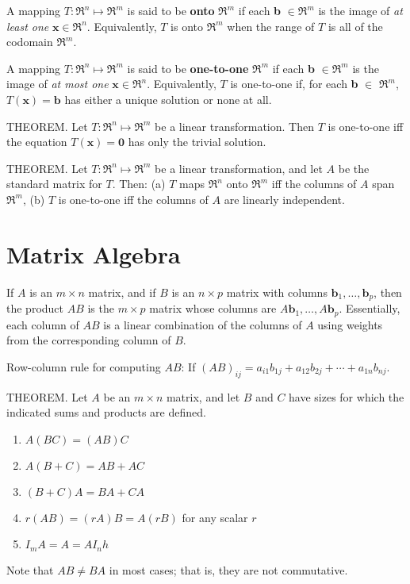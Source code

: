 \documentclass{article}
\begin{document}
\hfill \newline A mapping $T: \Re^n \mapsto \Re^m$ is said to be \textbf{onto} $\Re^m$ if each \textbf{b} $\in \Re^m$ is the image of \textit{at least one} $\textbf{x} \in \Re^n$. Equivalently, $T$ is onto $\Re^m$ when the range of $T$ is all of the codomain $\Re^m$.

\hfill \newline A mapping $T: \Re^n \mapsto \Re^m$ is said to be \textbf{one-to-one} $\Re^m$ if each \textbf{b} $\in \Re^m$ is the image of \textit{at most one} $\textbf{x} \in \Re^n$. Equivalently, $T$ is one-to-one if, for each \textbf{b} $\in$ $\Re^m$, $T(\textbf{x})=\textbf{b}$ has either a unique solution or none at all. 

\hfill \newline THEOREM. Let $T: \Re^n \mapsto \Re^m$ be a linear transformation. Then $T$ is one-to-one iff the equation $T(\textbf{x})=\textbf{0}$ has only the trivial solution.

\hfill \newline THEOREM. Let $T: \Re^n \mapsto \Re^m$ be a linear transformation, and let $A$ be the standard matrix for $T$. Then: (a) $T$ maps $\Re^n$ onto $\Re^m$ iff the columns of $A$ span $\Re^m$, (b) $T$ is one-to-one iff the columns of $A$ are linearly independent. 








\section{Matrix Algebra}

If $A$ is an $m \times n$ matrix, and if $B$ is an $n \times p$ matrix with columns $\textbf{b}_1,\dots,\textbf{b}_p$, then the product $AB$ is the $m \times p$ matrix whose columns are $A\textbf{b}_1,\dots,A\textbf{b}_p$. Essentially, each column of $AB$ is a linear combination of the columns of $A$ using weights from the corresponding column of $B$.

\hfill \newline Row-column rule for computing $AB$: If $(AB)_{ij} = a_{i1}b_{1j} + a_{12}b_{2j} + \cdots + a_{1n}b_{nj}$.

\hfill \newline THEOREM. Let $A$ be an $m \times n$ matrix, and let $B$ and $C$ have sizes for which the indicated sums and products are defined. 
\begin{enumerate}
    \item $A(BC)=(AB)C$
    \item $A(B+C)=AB+AC$
    \item $(B+C)A = BA + CA$
    \item $r(AB)=(rA)B = A(rB)$ for any scalar $r$
    \item $I_mA = A = AI_nh$
\end{enumerate}
\noindent Note that $AB \neq BA$ in most cases; that is, they are not commutative.
\end{document}
